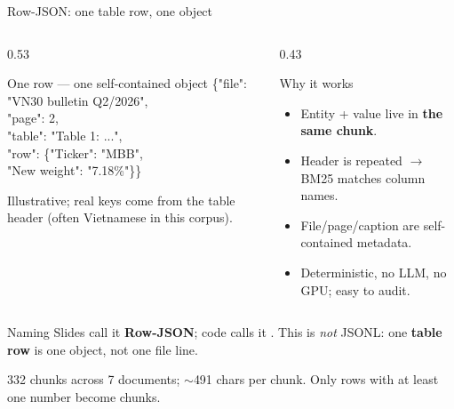 \documentclass[aspectratio=169,11pt]{beamer}
\newcommand{\code}[1]{\texttt{\detokenize{#1}}}
\begin{document}
\begin{frame}{Row-JSON: one table row, one object}
  \begin{columns}[T]
    \begin{column}{0.53\textwidth}
      \begin{block}{One row --- one self-contained object}
        {\scriptsize\ttfamily
        \{"file": "VN30 bulletin Q2/2026",\\
        \hspace*{1em}"page": 2,\\
        \hspace*{1em}"table": "Table 1: ...",\\
        \hspace*{1em}"row": \{"Ticker": "MBB",\\
        \hspace*{4em}"New weight": "7.18\%"\}\}}
      \end{block}
      {\footnotesize Illustrative; real keys come from the table header
      (often Vietnamese in this corpus).}
    \end{column}
    \begin{column}{0.43\textwidth}
      \begin{block}{Why it works}
        \begin{itemize}\small
          \item Entity + value live in \textbf{the same chunk}.
          \item Header is repeated $\rightarrow$ BM25 matches column names.
          \item File/page/caption are self-contained metadata.
          \item Deterministic, no LLM, no GPU; easy to audit.
        \end{itemize}
      \end{block}
    \end{column}
  \end{columns}

  \begin{alertblock}{Naming}
    \small
    Slides call it \textbf{Row-JSON}; code calls it \code{row_json}.
    This is \emph{not} JSONL: one \textbf{table row} is one object, not one
    file line.
  \end{alertblock}

  {\footnotesize
  332 chunks across 7 documents; $\sim$491 chars per chunk. Only rows with
  at least one number become chunks.}
\end{frame}
\end{document}
